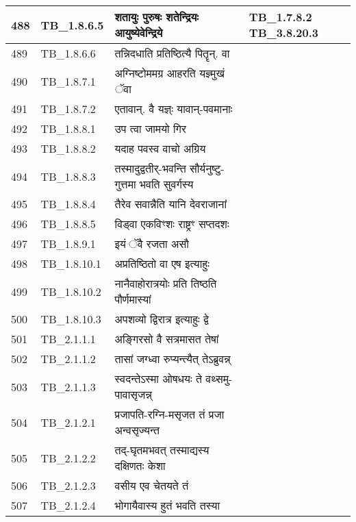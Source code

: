 \documentclass[17pt]{extarticle}
\begin{document}
\begin{longtable}{||p{0.4in}||p{0.9in}||p{4.0in}||p{0.9in}||}
        \hline
            488 & TB\_1.8.6.5 & शतायुः पुरुषः शतेन्द्रियः आयुष्येवेन्द्रिये & TB\_1.7.8.2  TB\_3.8.20.3       \\
        \hline
            489 & TB\_1.8.6.6 & तन्निदधाति प्रतिष्ठित्यै पितॄन्. वा &      \\
        \hline
            490 & TB\_1.8.7.1 & अग्निष्टोममग्र आहरति यज्ञ्मुखं ॅवा &      \\
        \hline
            491 & TB\_1.8.7.2 & एतावान्. वै यज्ञ्ः यावान्{-}पवमानाः &      \\
        \hline
            492 & TB\_1.8.8.1 & उप त्वा जामयो गिर &      \\
        \hline
            493 & TB\_1.8.8.2 & यदाह पवस्व वाचो अग्रिय &      \\
        \hline
            494 & TB\_1.8.8.3 & तस्मादुद्वतीर्{-}भवन्ति सौर्यनुष्टु{-}गुत्तमा भवति सुवर्गस्य &      \\
        \hline
            495 & TB\_1.8.8.4 & तैरेव सवान्नैति यानि देवराजानां &      \\
        \hline
            496 & TB\_1.8.8.5 & विड्वा एकविꣳशः राष्ट्रꣳ सप्तदशः &      \\
        \hline
            497 & TB\_1.8.9.1 & इयं ॅवै रजता असौ &      \\
        \hline
            498 & TB\_1.8.10.1 & अप्रतिष्ठितो वा एष इत्याहुः &      \\
        \hline
            499 & TB\_1.8.10.2 & नानैवाहोरात्रयोः प्रति तिष्ठति पौर्णमास्यां &      \\
        \hline
            500 & TB\_1.8.10.3 & अपशव्यो द्विरात्र इत्याहुः द्वे &      \\
        \hline
            501 & TB\_2.1.1.1 & अङ्गिरसो वै सत्रमासत तेषां &      \\
        \hline
            502 & TB\_2.1.1.2 & तासां जग्ध्वा रुप्यन्त्यैत् तेऽब्रुवन्न् &      \\
        \hline
            503 & TB\_2.1.1.3 & स्वदन्तेऽस्मा ओषधयः ते वथ्समु{-}पावासृजन्न् &      \\
        \hline
            504 & TB\_2.1.2.1 & प्रजापति{-}रग्नि{-}मसृजत तं प्रजा अन्वसृज्यन्त &      \\
        \hline
            505 & TB\_2.1.2.2 & तद्{-}घृतमभवत् तस्माद्यस्य दक्षिणतः केशा &      \\
        \hline
            506 & TB\_2.1.2.3 & वसीय एव चेतयते तं &      \\
        \hline
            507 & TB\_2.1.2.4 & भोगायैवास्य हुतं भवति तस्या &      \\

\end{longtable}
\end{document}
